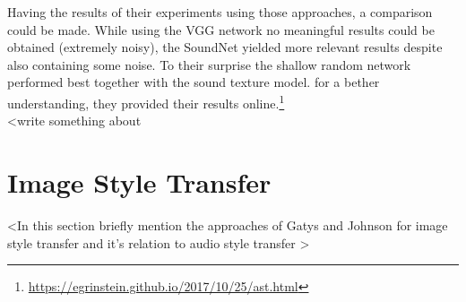 Having the results of their experiments using those approaches, a comparison could be made. While using the VGG network no meaningful results could be obtained (extremely noisy), the SoundNet yielded more relevant results despite also containing some noise. To their surprise the shallow random network performed best together with the sound texture model. for a bether understanding, they provided their results online.\footnote{\url{https://egrinstein.github.io/2017/10/25/ast.html}}\\

<write something about \cite{chen2020audio}

\section{Image Style Transfer}
\label{sec:rw_imgstyletransfer}

<In this section briefly mention the approaches of Gatys and Johnson for image style transfer and it's relation to audio style transfer \cite{Gatys2016, johnson2016perceptual}>